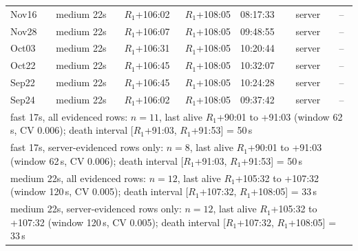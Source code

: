 \begin{tabular}{llrrlll}
Nov16 & medium 22s & $R_1$+106:02 & $R_1$+108:05 & 08:17:33 & server & -- \\
Nov28 & medium 22s & $R_1$+106:07 & $R_1$+108:05 & 09:48:55 & server & -- \\
Oct03 & medium 22s & $R_1$+106:31 & $R_1$+108:05 & 10:20:44 & server & -- \\
Oct22 & medium 22s & $R_1$+106:45 & $R_1$+108:05 & 10:32:07 & server & -- \\
Sep22 & medium 22s & $R_1$+106:45 & $R_1$+108:05 & 10:24:28 & server & -- \\
Sep24 & medium 22s & $R_1$+106:02 & $R_1$+108:05 & 09:37:42 & server & -- \\
\midrule
\multicolumn{7}{l}{fast 17s, all evidenced rows: $n=11$, last alive $R_1$+90:01 to +91:03 (window 62\,s, CV 0.006); death interval [$R_1$+91:03, $R_1$+91:53] = 50\,s} \\
\multicolumn{7}{l}{fast 17s, server-evidenced rows only: $n=8$, last alive $R_1$+90:01 to +91:03 (window 62\,s, CV 0.006); death interval [$R_1$+91:03, $R_1$+91:53] = 50\,s} \\
\multicolumn{7}{l}{medium 22s, all evidenced rows: $n=12$, last alive $R_1$+105:32 to +107:32 (window 120\,s, CV 0.005); death interval [$R_1$+107:32, $R_1$+108:05] = 33\,s} \\
\multicolumn{7}{l}{medium 22s, server-evidenced rows only: $n=12$, last alive $R_1$+105:32 to +107:32 (window 120\,s, CV 0.005); death interval [$R_1$+107:32, $R_1$+108:05] = 33\,s} \\
\bottomrule
\end{tabular}
